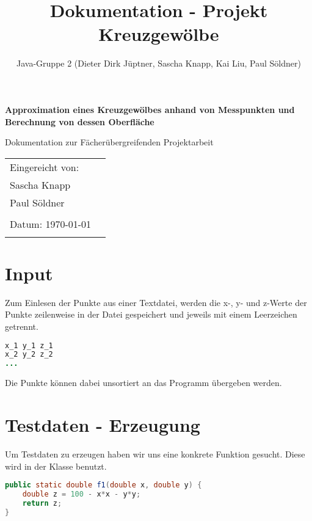 \documentclass[11pt, bibliography=totocnumbered]{scrartcl}
\title{Dokumentation - Projekt Kreuzgew\"olbe}
\author{Java-Gruppe 2 (Dieter Dirk J\"uptner, Sascha Knapp, Kai Liu, Paul S\"oldner)}
\begin{document}
	\begin{titlepage}
		\begin{center}
			\vspace*{2cm}
			
			\huge
			\textbf{Approximation eines Kreuzgew\"olbes anhand von Messpunkten und Berechnung von dessen Oberfl\"ache}
			
			\vspace{1.5cm}
			\LARGE
			Dokumentation zur F\"acher\"ubergreifenden Projektarbeit
		\end{center}    
		\vspace{1cm}
		
		\vfill{}
		\large
		\begin{tabular}{@{}l l}
			Eingereicht von: & \\
			Sascha Knapp \\
			Paul S\"oldner \\
			\\
			Datum: \today \\
			\\
		\end{tabular}
		\vfill
	\end{titlepage}
\newpage
\tableofcontents
\newpage
\section{Input}
Zum Einlesen der Punkte aus einer Textdatei, werden die x-, y- und z-Werte der Punkte zeilenweise in der Datei gespeichert und jeweils mit einem Leerzeichen getrennt. 
\begin{lstlisting}[caption={Input-Datei}, label={lst:label}, language=Java]
x_1 y_1 z_1
x_2 y_2 z_2
...
\end{lstlisting}

Die Punkte k\"onnen dabei unsortiert an das Programm \"ubergeben werden. 
\section{Testdaten - Erzeugung}

Um Testdaten zu erzeugen haben wir uns eine konkrete Funktion gesucht. Diese wird in der Klasse \grqq benutzt. 

\begin{lstlisting}[caption={Funktion zur Testdaten-Erzeugung}, label={lst:label}, language=Java]
public static double f1(double x, double y) {
	double z = 100 - x*x - y*y;
	return z;
}
\end{lstlisting}
\end{document}
